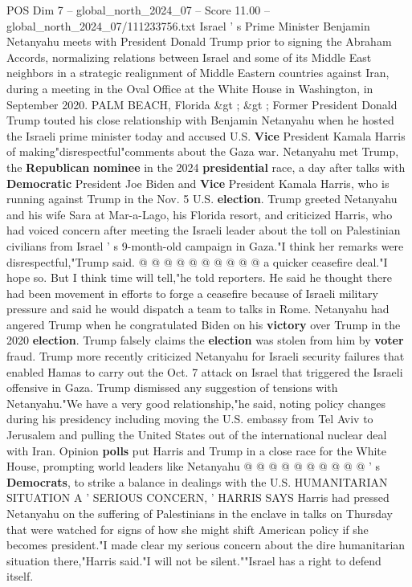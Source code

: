 \begin{textsample}{POS Dim 7 – global\_north\_2024\_07 – Score 11.00 – global\_north\_2024\_07/111233756.txt}  \label{ex:f7_pos_049}
Israel ' s Prime Minister Benjamin Netanyahu meets with President Donald Trump prior to signing the Abraham Accords, normalizing relations between Israel and some of its Middle East neighbors in a strategic realignment of Middle Eastern countries against Iran, during a meeting in the Oval Office at the White House in Washington, in September 2020.
PALM BEACH, Florida \&gt ; \&gt ; Former President Donald Trump touted his close relationship with Benjamin Netanyahu when he hosted the Israeli prime minister today and accused U.S. \textbf{Vice} President Kamala Harris of making"disrespectful"comments about the Gaza war.
Netanyahu met Trump, the \textbf{Republican} \textbf{nominee} in the 2024 \textbf{presidential} race, a day after talks with \textbf{Democratic} President Joe Biden and \textbf{Vice} President Kamala Harris, who is running against Trump in the Nov. 5 U.S. \textbf{election}.
Trump greeted Netanyahu and his wife Sara at Mar-a-Lago, his Florida resort, and criticized Harris, who had voiced concern after meeting the Israeli leader about the toll on Palestinian civilians from Israel ' s 9-month-old campaign in Gaza."I think her remarks were disrespectful,"Trump said. @ @ @ @ @ @ @ @ @ @ a quicker ceasefire deal."I hope so.
But I think time will tell,"he told reporters.
He said he thought there had been movement in efforts to forge a ceasefire because of Israeli military pressure and said he would dispatch a team to talks in Rome.
Netanyahu had angered Trump when he congratulated Biden on his \textbf{victory} over Trump in the 2020 \textbf{election}.
Trump falsely claims the \textbf{election} was stolen from him by \textbf{voter} fraud.
Trump more recently criticized Netanyahu for Israeli security failures that enabled Hamas to carry out the Oct. 7 attack on Israel that triggered the Israeli offensive in Gaza.
Trump dismissed any suggestion of tensions with Netanyahu."We have a very good relationship,"he said, noting policy changes during his presidency including moving the U.S. embassy from Tel Aviv to Jerusalem and pulling the United States out of the international nuclear deal with Iran.
Opinion \textbf{polls} put Harris and Trump in a close race for the White House, prompting world leaders like Netanyahu @ @ @ @ @ @ @ @ @ @ ' s \textbf{Democrats}, to strike a balance in dealings with the U.S.
HUMANITARIAN SITUATION A ' SERIOUS CONCERN, ' HARRIS SAYS Harris had pressed Netanyahu on the suffering of Palestinians in the enclave in talks on Thursday that were watched for signs of how she might shift American policy if she becomes president."I made clear my serious concern about the dire humanitarian situation there,"Harris said."I will not be silent.""Israel has a right to defend itself.

\end{textsample}
